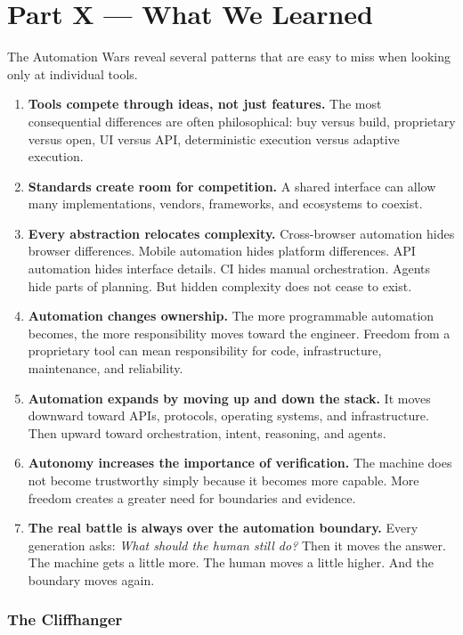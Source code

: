 \documentclass[11pt,twoside]{book}
\begin{document}
\chapter*{Part X — What We Learned}

The Automation Wars reveal several patterns that are easy to miss when looking only at individual tools.

\begin{enumerate}
    \item \textbf{Tools compete through ideas, not just features.} The most consequential differences are often philosophical: buy versus build, proprietary versus open, UI versus API, deterministic execution versus adaptive execution.
    \item \textbf{Standards create room for competition.} A shared interface can allow many implementations, vendors, frameworks, and ecosystems to coexist.
    \item \textbf{Every abstraction relocates complexity.} Cross-browser automation hides browser differences. Mobile automation hides platform differences. API automation hides interface details. CI hides manual orchestration. Agents hide parts of planning. But hidden complexity does not cease to exist.
    \item \textbf{Automation changes ownership.} The more programmable automation becomes, the more responsibility moves toward the engineer. Freedom from a proprietary tool can mean responsibility for code, infrastructure, maintenance, and reliability.
    \item \textbf{Automation expands by moving up and down the stack.} It moves downward toward APIs, protocols, operating systems, and infrastructure. Then upward toward orchestration, intent, reasoning, and agents.
    \item \textbf{Autonomy increases the importance of verification.} The machine does not become trustworthy simply because it becomes more capable. More freedom creates a greater need for boundaries and evidence.
    \item \textbf{The real battle is always over the automation boundary.} Every generation asks: \emph{What should the human still do?} Then it moves the answer. The machine gets a little more. The human moves a little higher. And the boundary moves again.
\end{enumerate}

\subsection*{The Cliffhanger}
\end{document}
